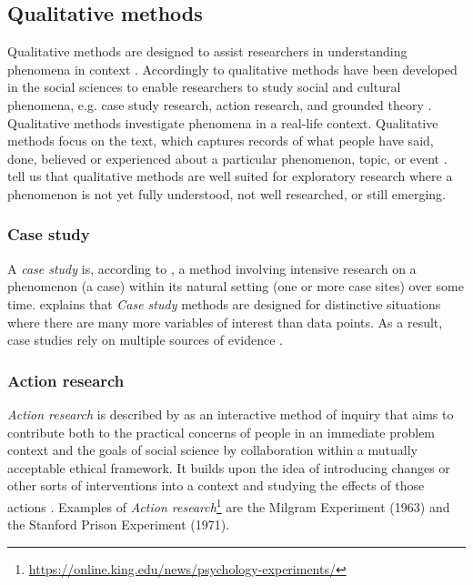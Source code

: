 \subsection{Qualitative methods}
\label{sub:qualitativemethods}
Qualitative methods are designed to assist researchers in understanding phenomena in context \parencite[p.~84]{Recker2012}. Accordingly to \textcite[p.~84]{Recker2012} qualitative methods have been developed in the social sciences to enable researchers to study social and cultural phenomena, e.g. case study research, action research, and grounded theory \parencite[p.~85]{Recker2012}. Qualitative methods investigate phenomena in a real-life context. Qualitative methods focus on the text, which captures records of what people have said, done, believed or experienced about a particular phenomenon, topic, or event \parencite[p.~85]{Recker2012}. \textcite[p.~84]{Recker2012} tell us that qualitative methods are well suited for exploratory research where a phenomenon is not yet fully understood, not well researched, or still emerging.

\subsubsection{Case study}
\label{subsub:case study}
A \textit{case study} is, according to \textcite[p.~92]{Recker2012}, a method involving intensive research on a phenomenon (a case) within its natural setting (one or more case sites) over some time. \textcite[p.~92]{Recker2012} explains that \textit{Case study} methods are designed for distinctive situations where there are many more variables of interest than data points. As a result, case studies rely on multiple sources of evidence \parencite[p.~92]{Recker2012}.

\subsubsection{Action research}
\label{subsub:actionresearch}
\textit{Action research} is described by \textcite[p.~96]{Recker2012} as an interactive method of inquiry that aims to contribute both to the practical concerns of people in an immediate problem context and the goals of social science by collaboration within a mutually acceptable ethical framework. It builds upon the idea of introducing changes or other sorts of interventions into a context and studying the effects of those actions \parencite[p.~96]{Recker2012}. Examples of \textit{Action research}\footnote{\url{https://online.king.edu/news/psychology-experiments/}} are the Milgram Experiment (1963) and the Stanford Prison Experiment (1971).

